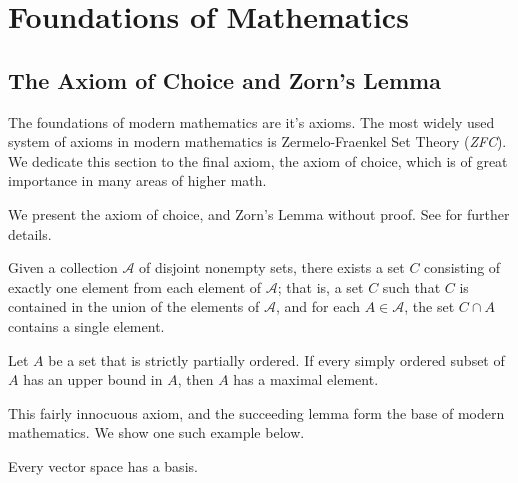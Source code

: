 \chapter[Foundations]{Foundations of Mathematics}

\section[Axiom of Choice]{The Axiom of Choice and Zorn's Lemma}

The foundations of modern mathematics are it's axioms. The most widely used system of axioms in modern mathematics is Zermelo-Fraenkel Set Theory (\textit{ZFC}). We dedicate this section to the final axiom, the axiom of choice, which is of great importance in many areas of higher math.

We present the axiom of choice, and Zorn's Lemma without proof. See \cite{munkrestopology} for further details.

\begin{definition}
  Given a collection $\mathcal{A}$ of disjoint nonempty sets, there exists a set $C$ consisting of exactly one element from each element of $\mathcal{A}$; that is, a set $C$ such that $C$ is contained in the union of the elements of $\mathcal{A}$, and for each $A \in \mathcal{A}$, the set $C\cap A$ contains a single element.
\end{definition}

\begin{lemma}
  Let $A$ be a set that is strictly partially ordered. If every simply ordered subset of $A$ has an upper bound in $A$, then $A$ has a maximal element.
\end{lemma}

This fairly innocuous axiom, and the succeeding lemma form the base of modern mathematics. We show one such example below.

\begin{theorem}
  Every vector space has a basis.
\end{theorem}

